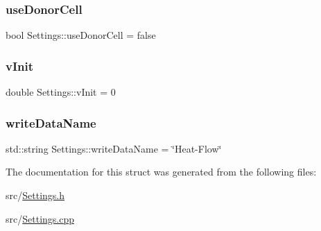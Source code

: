 \mbox{\label{structSettings_a05bd5ffa1e1b48f5dc99878538596db3}} 
\subsubsection{\texorpdfstring{useDonorCell}{useDonorCell}}
{\footnotesize\ttfamily bool Settings\+::use\+Donor\+Cell = false}

\mbox{\label{structSettings_aa7b1e081e14588a401b4d8d6a7cda56b}} 
\subsubsection{\texorpdfstring{vInit}{vInit}}
{\footnotesize\ttfamily double Settings\+::v\+Init = 0}

\mbox{\label{structSettings_ac8ea06951df9df0dad0c7850c606fd1f}} 
\subsubsection{\texorpdfstring{writeDataName}{writeDataName}}
{\footnotesize\ttfamily std\+::string Settings\+::write\+Data\+Name = \char`\"{}Heat-\/Flow\char`\"{}}



The documentation for this struct was generated from the following files\+:\begin{DoxyCompactItemize}
\item 
src/\mbox{\hyperlink{Settings_8h}{Settings.\+h}}\item 
src/\mbox{\hyperlink{Settings_8cpp}{Settings.\+cpp}}\end{DoxyCompactItemize}
